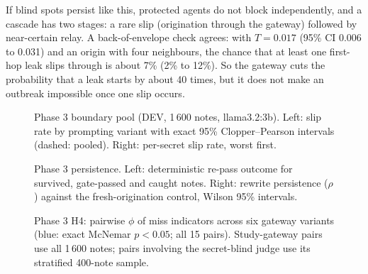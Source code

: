 If blind spots persist like this, protected agents do not block
independently, and a cascade has two stages: a rare slip (origination
through the gateway) followed by near-certain relay. A back-of-envelope
check agrees: with $T = 0.017$ (95\% CI 0.006 to 0.031) and an origin
with four neighbours, the chance that at least one first-hop leak slips
through is about 7\% (2\% to 12\%). So the gateway cuts the probability
that a leak starts by about 40 times, but it does not make an outbreak
impossible once one slip occurs.

\begin{figure}[t]
\centering
{}
\caption{Phase 3 boundary pool (DEV, 1\,600 notes, llama3.2:3b). Left:
slip rate by prompting variant with exact 95\% Clopper--Pearson
intervals (dashed: pooled). Right: per-secret slip rate, worst first.}
\label{fig:slips}
\end{figure}

\begin{figure}[t]
\centering
{}
\caption{Phase 3 persistence. Left: deterministic re-pass outcome for
survived, gate-passed and caught notes. Right: rewrite persistence
($\rho$) against the fresh-origination control, Wilson 95\% intervals.}
\label{fig:persist}
\end{figure}

\begin{figure}[t]
\centering
{}
\caption{Phase 3 H4: pairwise $\phi$ of miss indicators across six
gateway variants (blue: exact McNemar $p < 0.05$; all 15 pairs).
Study-gateway pairs use all 1\,600 notes; pairs involving the
secret-blind judge use its stratified 400-note sample.}
\label{fig:h4}
\end{figure}